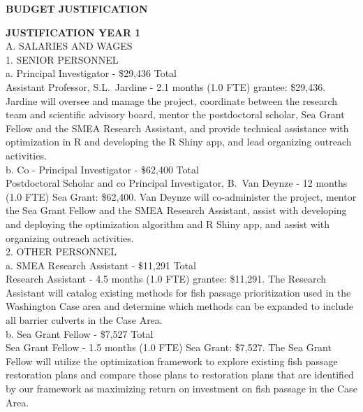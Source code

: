 \documentclass[12pt]{elsarticle}
\begin{document}
\begin{center} \textbf{BUDGET JUSTIFICATION} \end{center}

\noindent \textbf{JUSTIFICATION YEAR 1}\\

A. SALARIES AND WAGES\\

1. SENIOR PERSONNEL\\

a. Principal Investigator - \$29,436 Total\\

Assistant Professor, S.L.\ Jardine - 2.1 months (1.0 FTE) grantee: \$29,436. Jardine will oversee and manage the project, coordinate between the research team and scientific advisory board, mentor the postdoctoral scholar, Sea Grant Fellow and the SMEA Research Assistant, and provide technical assistance with optimization in R and developing the R Shiny app, and lead organizing outreach activities.\\

b. Co - Principal Investigator - \$62,400 Total\\

Postdoctoral Scholar and co Principal Investigator, B.\ Van Deynze - 12 months (1.0 FTE) Sea Grant: \$62,400. Van Deynze will co-administer the project, mentor the Sea Grant Fellow and the SMEA Research Assistant, assist with developing and deploying the optimization algorithm and R Shiny app, and assist with organizing outreach activities.\\

2. OTHER PERSONNEL\\

a. SMEA Research Assistant - \$11,291 Total\\
Research Assistant - 4.5 months (1.0 FTE) grantee: \$11,291. The Research Assistant will catalog existing methods for fish passage prioritization used in the Washington Case area and determine which methods can be expanded to include all barrier culverts in the Case Area.\\

b. Sea Grant Fellow -  \$7,527 Total\\
Sea Grant Fellow - 1.5 months (1.0 FTE) Sea Grant:  \$7,527. The Sea Grant Fellow will utilize the optimization framework to explore existing fish passage restoration plans and compare those plans to restoration plans that are identified by our framework as maximizing return on investment on fish passage in the Case Area. \\
\end{document}
